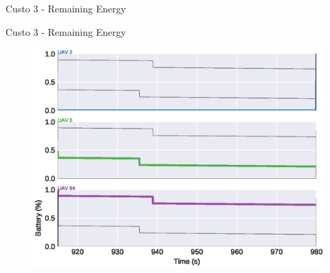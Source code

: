 \begin{frame}{Custo 3 - Remaining Energy}
\begin{figure}[!htb]
                    \end{figure}
                \end{frame}\begin{frame}{Custo 3 - Remaining Energy}
                    \begin{figure}[!htb]
                        \includegraphics[width=\textwidth]{custo_3/uav_remaining_energy_980.eps}
                    \end{figure}
                \end{frame}